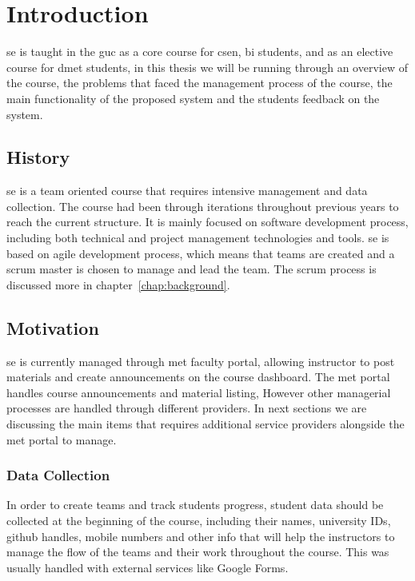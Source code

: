 \chapter{Introduction}
\label{chap:intro}

\ac{se} is taught in the \ac{guc} as a core course for \ac{csen}, \ac{bi} students, and as an elective course for \ac{dmet} students, in this thesis
we will be running through an overview of the course, the problems that faced the management process of the course, the main
functionality of the proposed system and the students feedback on the system.

\section{History}
\label{sec:history}
\ac{se} is a team oriented course that requires intensive management and data collection. The course had been through iterations throughout previous years
to reach the current structure. It is mainly focused on software development process, including both technical and project management
technologies and tools. \ac{se} is based on agile development process, which means that teams are created and a scrum master is chosen to manage
and lead the team. The scrum process is discussed more in chapter~\ref{chap:background}.

\section{Motivation}
\label{sec:motivation}

\ac{se} is currently managed through \ac{met} faculty portal, allowing instructor to post materials and
create announcements on the course dashboard. The \ac{met} portal handles course announcements and material listing, However other
managerial processes are handled through different providers. In next sections we are discussing the main items that requires
additional service providers alongside the \ac{met} portal to manage.


\subsection{Data Collection}
\label{sub:data-collection}

In order to create teams and track students progress, student data should be collected
at the beginning of the course, including their names, university IDs, github handles, mobile numbers and other info that will
help the instructors to manage the flow of the teams and their work throughout the course. This was usually handled with external services
like Google Forms.

